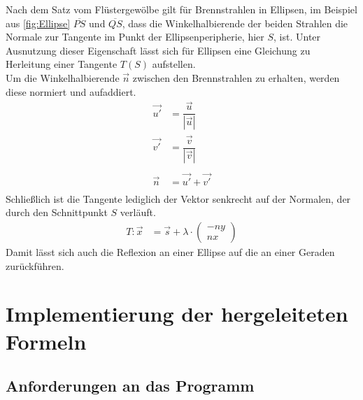 \documentclass[reducespace,stylepage,semiarbeit]{spezidoc}
\begin{document}
Nach dem Satz vom Flüstergewölbe gilt für Brennstrahlen in Ellipsen, im Beispiel aus \ref{fig:Ellipse} $\overline{PS}$ und $\overline{QS}$, dass die Winkelhalbierende der beiden Strahlen die Normale zur Tangente im Punkt der Ellipsenperipherie, hier $S$, ist. %
Unter Ausnutzung dieser Eigenschaft lässt sich für Ellipsen eine Gleichung zu Herleitung einer Tangente $T(S)$ aufstellen.\\
Um die Winkelhalbierende $\vec{n}$ zwischen den Brennstrahlen zu erhalten, werden diese normiert und aufaddiert.
\begin{equation*}
\begin{split}
\vec{u'} & = \dfrac{\vec{u}}{|\vec{u}|} \\
\vec{v'}  &= \dfrac{\vec{v}}{|\vec{v}|} \\ \\
\vec{n} & = \vec{u'} + \vec{v'} \\ 
\end{split}
\end{equation*}
Schließlich ist die Tangente lediglich der Vektor senkrecht auf der Normalen, der durch den Schnittpunkt $S$ verläuft.
\begin{equation*}
\begin{split}
T: \vec{x} & = \vec{s} + \lambda \cdot \begin{pmatrix} -ny \\ nx \end{pmatrix}
\end{split}
\end{equation*}
Damit lässt sich auch die Reflexion an einer Ellipse auf die an einer Geraden zurückführen.


\newpage

\section{Implementierung der hergeleiteten Formeln}\label{sec:sim} %

\subsection{Anforderungen an das Programm}
\end{document}

